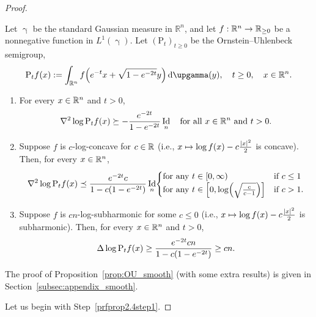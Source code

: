 \documentclass[AHL,Unicode,longabstracts]{cedram}
\newcommand{\R}{\mathbb R}
\DeclareMathOperator{\Id}{Id}
\newcommand{\Pheat}{\mathrm{P}}
\newcommand{\dd}{n}
\newcommand{\conv}{c}
\newcommand{\density}{f}
\newcommand*\diff{\mathop{}\!\mathrm{d}}
\newcommand{\Gaussian}{\upgamma}
\renewcommand*{\to}{\mathchoice{\longrightarrow}{\rightarrow}{\rightarrow}{\rightarrow}}
\let\oldmapsto\mapsto
\renewcommand*{\mapsto}{\mathchoice{\longmapsto}{\oldmapsto}{\oldmapsto}{\oldmapsto}}
\let\originalleft\left
\let\originalright\right
\renewcommand{\left}{\mathopen{}\mathclose\bgroup\originalleft}
\renewcommand{\right}{\aftergroup\egroup\originalright}
\let\oldin\in
\renewcommand{\in}{\mathchoice{\oldin}{\oldin}{\,\oldin\,}{\,\oldin\,}}
\newcounter{setofstep}
\newcounter{step}[setofstep]
\newcommand*{\relabel}{\renewcommand{\labelenumi}{(\theenumi)}}
\newcommand*{\romanenumi}{\renewcommand*{\theenumi}{\roman{enumi}}\relabel}
\begin{document}
\begin{proof}
\begin{prop}\label{prop:OU_smooth}
Let $\Gaussian$ be the standard Gaussian measure in $\R^{\dd}$, and let $f:\R^{\dd}\to \R_{\ge 0}$ be a nonnegative function in $L^1(\Gaussian)$. Let $(\Pheat_t)_{t\ge 0}$ be the Ornstein--Uhlenbeck semigroup,
\begin{equation}\label{eq:OU_def_prop}
\Pheat_t\density(x):=\int_{\R^{\dd}} \density\left(e^{-t}x+\sqrt{1-e^{-2t}}y\right)\diff \Gaussian(y),\quad t\ge 0,\quad x\in \R^{\dd}.
\end{equation}
\begin{enumerate}\romanenumi
\item\label{prop2.4.1} For every $x\in \R^{\dd}$ and $t>0$,
\begin{equation}\label{eq:less_lc}
\nabla^2\log\Pheat_t\density(x) \succeq -\frac{e^{-2t}}{1-e^{-2t}} \Id_{\dd}\quad \textnormal{for all }x\in\R^{\dd} \text{ and }t>0.
\end{equation}
\item\label{prop2.4.2} Suppose $\density$ is $\conv$-log-concave for $\conv\in \R$ (i.e., $x\mapsto \log \density(x)-\conv\frac{|x|^2}{2}$ is concave). Then, for every $x\in \R^{\dd}$,
\begin{equation}\label{eq:lc_OU}
\nabla^2\log\Pheat_t\density(x)\preceq \frac{ e^{-2t}\conv}{1-\conv(1-e^{-2t})} \Id_{\dd}
\begin{cases}
\text{for any }t\in [0,\infty) &\text{if }\conv\le 1\\
\text{for any }t\in \left[0,\log\left(\sqrt{\frac{\conv}{\conv-1}}\right)\right] &\text{if }\conv >1.
\end{cases}
\end{equation}
\item\label{prop2.4.3} Suppose $\density$ is $\conv\dd$-log-subharmonic for some $\conv\le 0$ (i.e., $x\mapsto \log f(x)-\conv\frac{|x|^2}{2}$ is subharmonic). Then, for every $x\in \R^{\dd}$ and $t>0$,
\begin{equation}\label{eq:beta_subharmonic}
\Delta\log\Pheat_t\density(x)\ge \frac{e^{-2t}\conv\dd}{1-\conv\left(1-e^{-2t}\right)}\ge \conv\dd.
\end{equation}
\end{enumerate}
\end{prop}

The proof of Proposition~\ref{prop:OU_smooth} (with some extra results) is given in Section~\ref{subsec:appendix_smooth}.


Let us begin with Step~\ref{prfprop2.4step1}.


\end{proof}
\end{document}
